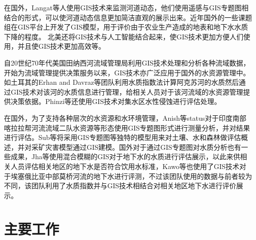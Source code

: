 在国外，Langat等人使用GIS技术来监测河道动态，他们使用遥感与GIS专题图相结合的形式，可以使河道动态信息更加简洁直观的展示出来\cite{langat2019}。近年国外的一些课题组在GIS平台上开发了GIS模型，用于评价由于农业生产造成的地表和地下水水质下降的程度。
北美还将GIS技术与人工智能结合起来，使GIS技术更加方便人们使用，并且使GIS技术更加高效等\cite{kva}。

自20世纪70年代美国田纳西河流域管理局利用GIS技术处理和分析各种流域数据，开始为流域管理提供决策服务以来，GIS技术亦广泛应用于国外的水资源管理中。如土耳其的Erhan and Davraz等团队\cite{eva}利用水质指数法计算阿克苏河的水质然后通过GIS技术对该河的水质信息进行管理，给相关人员对于该河流域的水资源管理提供决策依据。Phinzi等还使用GIS技术对集水区水性侵蚀进行评估处理。


在国外，为了支持各种层次的水资源和水环境管理，Anish等\cite{status}status对于印度南部喀拉拉帮河流流域二队水资源等形态使用GIS专题图形式进行测量分析，并对结果进行评估。Sub等\cite{overview}将采用GIS专题图等独特的模型用来对土壤、水和森林做评估概述，并对采矿灾害模型通过GIS建模。国外对于通过GIS专题图对水质分析也有一些成果，Jha等\cite{jha}使用混合模糊的GIS对于地下水的水质进行评估展示，以此来供相关人员评估相关地区的地下水是否符合饮用水标准，Kawo等\cite{kawo2018}也使用了GIS技术对于埃塞俄比亚中部莫桥河流的地下水进行评测，不过该团队使用的数据与前者较为不同，该团队利用了水质指数并与GIS技术相结合对相关地区地下水进行评价展示。




\section{主要工作}

